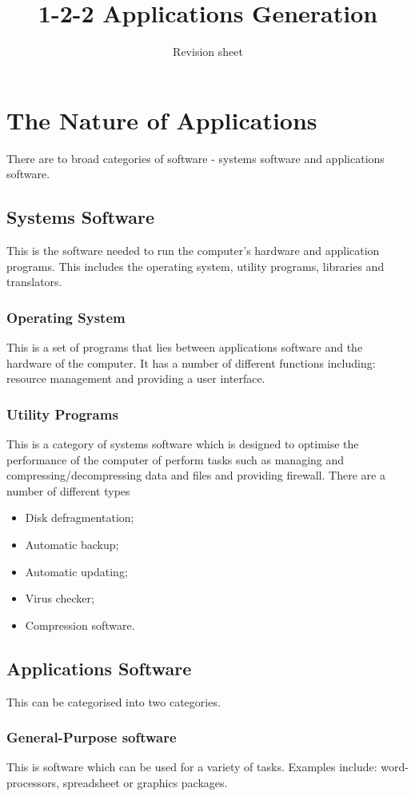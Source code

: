 \documentclass[a4paper,11pt, twocolumn]{article}
\title{1-2-2 Applications Generation}
\author{Revision sheet}
\date{}
\begin{document}
\maketitle
\thispagestyle{fancy}

\section{The Nature of Applications}
There are to broad categories of software - systems software and applications software. 
\subsection{Systems Software}
This is the software needed to run the computer's hardware and application programs. This includes the operating system, utility programs, libraries and translators.
\subsubsection{Operating System}
This is a set of programs that lies between applications software and the hardware of the computer. It has a number of different functions including: resource management and providing a user interface.
\subsubsection{Utility Programs}
This is a category of systems software which is designed to optimise the performance of the computer of perform tasks such as managing and compressing/decompressing data and files and providing firewall. There are a number of different types
\begin{itemize}
    \item Disk defragmentation;
    \item Automatic backup;
    \item Automatic updating;
    \item Virus checker;
    \item Compression software.
\end{itemize}
\subsection{Applications Software}
This can be categorised into two categories.
\subsubsection{General-Purpose software}
This is software which can be used for a variety of tasks. Examples include: word-processors, spreadsheet or graphics packages. 
\end{document}

